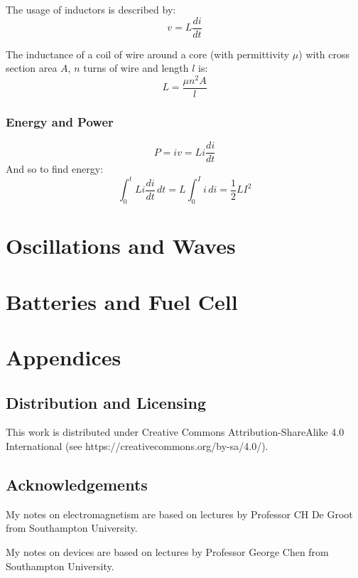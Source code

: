 \documentclass[11pt,a4paper]{report}
\begin{document}
The usage of inductors is described by:
\begin{equation*}
	v = L\frac{di}{dt}
\end{equation*}

The inductance of a coil of wire around a core (with permittivity $\mu$) with cross section area $A$, $n$ turns of wire and length $l$ is:
\begin{equation*}
	L = \frac{\mu n^2A}{l}
\end{equation*}

\subsection{Energy and Power}
\begin{equation*}
	P = iv = Li\frac{di}{dt}
\end{equation*}
And so to find energy:
\begin{equation*}
	\int_0^t Li\frac{di}{dt} \, dt = L\int_0^I i \, di = \frac{1}{2}LI^2
\end{equation*}

\chapter{Oscillations and Waves}

\chapter{Batteries and Fuel Cell}

\chapter{Appendices}
\section{Distribution and Licensing}
This work is distributed under Creative Commons Attribution-ShareAlike 4.0
International (see https://creativecommons.org/by-sa/4.0/).

\section{Acknowledgements}
My notes on electromagnetism are based on lectures by Professor CH De Groot from Southampton University.

My notes on devices are based on lectures by Professor George Chen from Southampton University.
\end{document}
